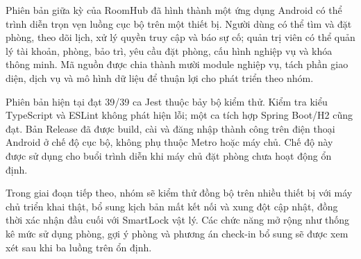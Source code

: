 Phiên bản giữa kỳ của RoomHub đã hình thành một ứng dụng Android có thể trình diễn trọn vẹn luồng cục bộ trên một thiết bị. Người dùng có thể tìm và đặt phòng, theo dõi lịch, xử lý quyền truy cập và báo sự cố; quản trị viên có thể quản lý tài khoản, phòng, bảo trì, yêu cầu đặt phòng, cấu hình nghiệp vụ và khóa thông minh. Mã nguồn được chia thành mười module nghiệp vụ, tách phần giao diện, dịch vụ và mô hình dữ liệu để thuận lợi cho phát triển theo nhóm.

Phiên bản hiện tại đạt 39/39 ca Jest thuộc bảy bộ kiểm thử. Kiểm tra kiểu TypeScript và ESLint không phát hiện lỗi; một ca tích hợp Spring Boot/H2 cũng đạt. Bản Release đã được build, cài và đăng nhập thành công trên điện thoại Android ở chế độ cục bộ, không phụ thuộc Metro hoặc máy chủ. Chế độ này được sử dụng cho buổi trình diễn khi máy chủ đặt phòng chưa hoạt động ổn định.

Trong giai đoạn tiếp theo, nhóm sẽ kiểm thử đồng bộ trên nhiều thiết bị với máy chủ triển khai thật, bổ sung kịch bản mất kết nối và xung đột cập nhật, đồng thời xác nhận đầu cuối với SmartLock vật lý. Các chức năng mở rộng như thống kê mức sử dụng phòng, gợi ý phòng và phương án check-in bổ sung sẽ được xem xét sau khi ba luồng trên ổn định.
